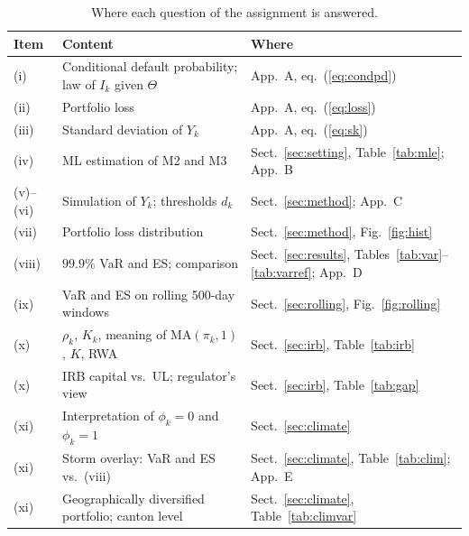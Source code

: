 \begin{table}[!htb]
\caption{Where each question of the assignment is answered.}
\label{tab:map}
\centering
{\small\setlength{\tabcolsep}{4pt}
\begin{tabular}{@{}lp{}l@{}}
\toprule
Item & Content & Where \\
\midrule
(i) & Conditional default probability; law of $I_k$ given $\Theta$ & App.~A, eq.~(\ref{eq:condpd}) \\
(ii) & Portfolio loss & App.~A, eq.~(\ref{eq:loss}) \\
(iii) & Standard deviation of $Y_k$ & App.~A, eq.~(\ref{eq:sk}) \\
(iv) & ML estimation of M2 and M3 & Sect.~\ref{sec:setting}, Table~\ref{tab:mle}; App.~B \\
(v)--(vi) & Simulation of $Y_k$; thresholds $d_k$ & Sect.~\ref{sec:method}; App.~C \\
(vii) & Portfolio loss distribution & Sect.~\ref{sec:method}, Fig.~\ref{fig:hist} \\
(viii) & $99.9\%$ VaR and ES; comparison & Sect.~\ref{sec:results}, Tables~\ref{tab:var}--\ref{tab:varref}; App.~D \\
(ix) & VaR and ES on rolling 500-day windows & Sect.~\ref{sec:rolling}, Fig.~\ref{fig:rolling} \\
(x) & $\rho_k$, $K_k$, meaning of $\mathrm{MA}(\pi_k,1)$, $K$, RWA & Sect.~\ref{sec:irb}, Table~\ref{tab:irb} \\
(x) & IRB capital vs.\ UL; regulator's view & Sect.~\ref{sec:irb}, Table~\ref{tab:gap} \\
(xi) & Interpretation of $\phi_k=0$ and $\phi_k=1$ & Sect.~\ref{sec:climate} \\
(xi) & Storm overlay: VaR and ES vs.\ (viii) & Sect.~\ref{sec:climate}, Table~\ref{tab:clim}; App.~E \\
(xi) & Geographically diversified portfolio; canton level & Sect.~\ref{sec:climate}, Table~\ref{tab:climvar} \\
\bottomrule
\end{tabular}}
\end{table}
